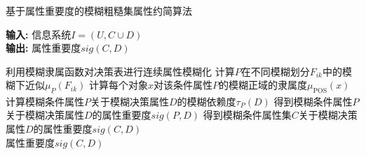 \begin{algorithm}[htbp]
    \caption{基于属性重要度的模糊粗糙集属性约简算法} %
    \label{alg:FRARAlgorithm}
    \hspace*{0.02in} {\bf 输入:} %
    信息系统$I=(U,C\cup D)$\\
    \hspace*{0.02in} {\bf 输出:} %
    属性重要度$sig(C,D)$
    \begin{algorithmic}
        \State 利用模糊隶属函数对决策表进行连续属性模糊化
        \State 计算$P$在不同模糊划分$F_{ik}$中的模糊下近似$\mu_{\underline{P}}(F_{ik})$
                \State 计算每个对象$x$对该条件属性$P$的模糊正域的隶属度$\mu_{\operatorname{POS}}(x)$
        \EndFor
        \State 计算模糊条件属性$P$关于模糊决策属性$D$的模糊依赖度$\tau_{P}(D)$
        \State 得到模糊条件属性$P$关于模糊决策属性$D$的属性重要度$sig(P,D)$
        \EndFor
        \State 得到模糊条件属性集$C$关于模糊决策属性$D$的属性重要度$sig(C,D)$\\
    \Return 属性重要度$sig(C,D)$
    \end{algorithmic}
    \end{algorithm}




